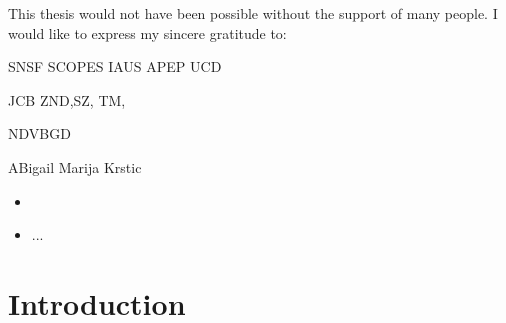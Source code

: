 \documentclass[11pt]{report}
\begin{document}
This thesis would not have been possible without the support of many people. I would like to express my sincere gratitude to:

SNSF
SCOPES
IAUS
APEP UCD

JCB
ZND,SZ, TM,

NDVBGD

ABigail
Marija Krstic

\begin{itemize}
\item 
\item ...
\end{itemize}




\chapter{Introduction}
\end{document}

